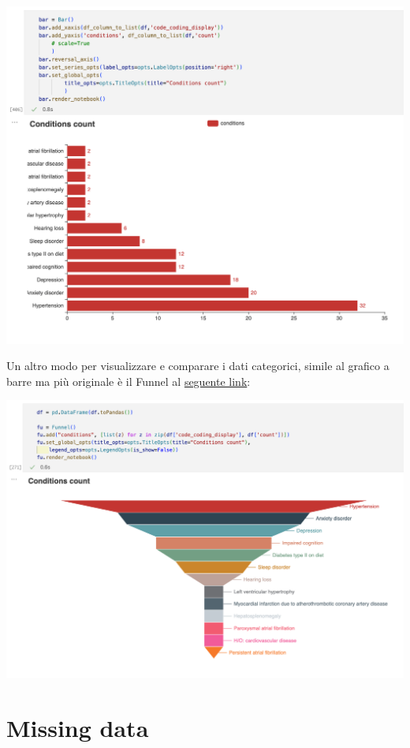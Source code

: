 \documentclass[11pt, oneside]{article}
\begin{document}
\begin{center}
\includegraphics[scale=0.5]{1_bars.png}
\end{center}

Un altro modo per visualizzare e comparare i dati categorici, simile al grafico a barre ma più originale è il Funnel al \href{https://github.com/tommasoromano/scientific-vision/blob/main/renderers/funnel_conditions.html}{seguente link}:

\begin{center}
\includegraphics[scale=0.5]{1_funnel.png}
\end{center}

\section{Missing data}
\end{document}
